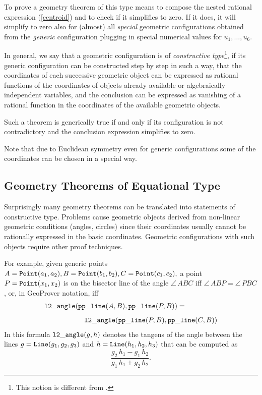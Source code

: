 \documentclass[11pt]{article}
\newcommand{\gf}[1]{{\tt #1}\/}
\newcommand{\hsp}{\hspace*{1cm}}
\newcommand{\formel}[1]{\[\begin{array}{l}#1\end{array}\]}
\begin{document}
To prove a geometry theorem of this type means to compose the
nested rational expression (\ref{centroid}) and to check if it
simplifies to zero. If it does, it will simplify to zero also for
(almost) all {\em special} geometric configurations obtained from
the {\em generic} configuration plugging in special numerical
values for $u_1,\ldots,u_6$. 
\medskip

In general, we say that a geometric configuration is of {\em
constructive type}\footnote{This notion is different from
\cite{Books/Chou_88a}.}, if its generic configuration can be
constructed step by step in such a way, that the coordinates of each
successive geometric object can be expressed as rational functions of
the coordinates of objects already available or algebraically
independent variables, and the conclusion can be expressed as
vanishing of a rational function in the coordinates of the available
geometric objects.

Such a theorem is generically true if and only if its configuration is
not contradictory and the conclusion expression simplifies to zero.

Note that due to Euclidean symmetry even for generic
configurations some of the coordinates can be chosen in a special
way.

\subsection{Geometry Theorems of Equational Type}

Surprisingly many geometry theorems can be translated into
statements of constructive type.  Problems cause geometric
objects derived from non-linear geo\-metric conditions (angles,
circles) since their coordinates usually cannot be rationally
expressed in the basic coordinates. Geometric configurations
with such objects require other proof techniques.

For example, given generic points $A=\gf{Point}(a_1,a_2),
B=\gf{Point}(b_1,b_2),\\ C=\gf{Point}(c_1,c_2),$ a point
$P=\gf{Point}(x_1,x_2)$ is on the bisector line of the angle
$\angle\,ABC$ iff $\angle\,ABP=\angle\,PBC$, or, in GeoProver
notation, iff
\formel{\gf{l2\_angle}(\gf{pp\_line}(A,B),\gf{pp\_line}(P,B))
   =\\[8pt]\hsp\hsp
   \gf{l2\_angle}(\gf{pp\_line}(P,B),\gf{pp\_line}(C,B)) }
In this formula $\gf{l2\_angle}(g,h)$ denotes the tangens of the angle
between the lines $g=\gf{Line}(g_1,g_2,g_3)$ and
$h=\gf{Line}(h_1,h_2,h_3)$ that can be computed as
$$\frac{g_2\,h_1-g_1\,h_2}{g_1\,h_1+g_2\,h_2}.$$
\end{document}
